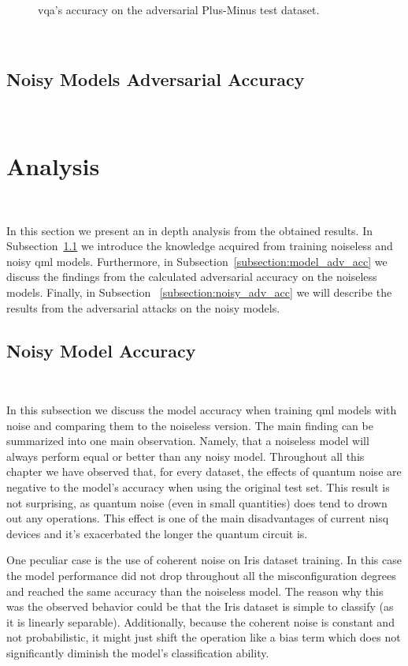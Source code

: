 \begin{figure}[!h]
  \caption{\ac{vqa}'s accuracy on the adversarial Plus-Minus test dataset.}
  \label{fig:pm-34}
\end{figure} \

\subsection{Noisy Models Adversarial Accuracy}\label{subsection:plus-minus-noisy-adv-acc} \

\section{Analysis}\label{section:analysis} \

In this section we present an in depth analysis from the obtained
results. In Subsection~\ref{subsection:model_acc} we introduce
the knowledge acquired from training noiseless and noisy \ac{qml}
models. Furthermore, in Subsection~\ref{subsection:model_adv_acc}
we discuss the findings from the calculated adversarial accuracy
on the noiseless models. Finally, in Subsection
~\ref{subsection:noisy_adv_acc} we will describe the results
from the adversarial attacks on the noisy models. \

\subsection{Noisy Model Accuracy}\label{subsection:model_acc} \

In this subsection we discuss the model accuracy when training
\ac{qml} models with noise and comparing them to the noiseless
version. The main finding can be summarized into one main observation.
Namely, that a noiseless model will always perform equal or better
than any noisy model. Throughout all this chapter we have observed
that, for every dataset, the effects of quantum noise are negative
to the model's accuracy when using the original test set. This
result is not surprising, as quantum noise (even in small
quantities) does tend to drown out any operations. This effect
is one of the main disadvantages of current \ac{nisq} devices
and it's exacerbated the longer the quantum circuit is. \

One peculiar case is the use of coherent noise on Iris dataset
training. In this case the model performance did not drop
throughout all the misconfiguration degrees and reached the
same accuracy than the noiseless model. The reason why this
was the observed behavior could be that the Iris dataset is
simple to classify (as it is linearly separable). Additionally,
because the coherent noise is constant and not probabilistic,
it might just shift the operation like a bias term which does
not significantly diminish the model's classification ability. \

